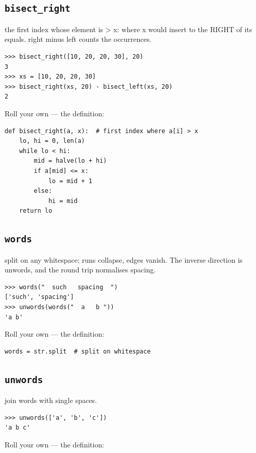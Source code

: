 \documentclass[10pt,letterpaper]{book}
\begin{document}
\subsection{\texttt{bisect\_right}}\label{def:bisect-right}
the first index whose element is > x: where x would insert to the RIGHT of its equals. right minus left counts the occurrences.
\begin{lstlisting}[style=ex]
>>> bisect_right([10, 20, 20, 30], 20)
3
>>> xs = [10, 20, 20, 30]
>>> bisect_right(xs, 20) - bisect_left(xs, 20)
2
\end{lstlisting}

Roll your own --- the definition:

\begin{lstlisting}[style=ex]
def bisect_right(a, x):  # first index where a[i] > x
    lo, hi = 0, len(a)
    while lo < hi:
        mid = halve(lo + hi)
        if a[mid] <= x:
            lo = mid + 1
        else:
            hi = mid
    return lo
\end{lstlisting}
\subsection{\texttt{words}}\label{def:words}
split on any whitespace; runs collapse, edges vanish. The inverse direction is unwords, and the round trip normalises spacing.
\begin{lstlisting}[style=ex]
>>> words("  such   spacing  ")
['such', 'spacing']
>>> unwords(words("  a   b "))
'a b'
\end{lstlisting}

Roll your own --- the definition:

\begin{lstlisting}[style=ex]
words = str.split  # split on whitespace
\end{lstlisting}

\subsection{\texttt{unwords}}\label{def:unwords}
join words with single spaces.
\begin{lstlisting}[style=ex]
>>> unwords(['a', 'b', 'c'])
'a b c'
\end{lstlisting}

Roll your own --- the definition:
\end{document}
